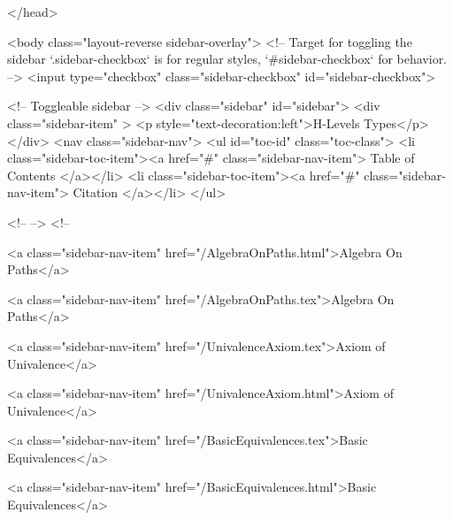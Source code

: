   
</head>




  <body class="layout-reverse sidebar-overlay">
    <!-- Target for toggling the sidebar `.sidebar-checkbox` is for regular
     styles, `#sidebar-checkbox` for behavior. -->
<input type="checkbox" class="sidebar-checkbox" id="sidebar-checkbox">

<!-- Toggleable sidebar -->
<div class="sidebar" id="sidebar">
  <div class="sidebar-item" >
    <p style="text-decoration:left">H-Levels Types</p>
  </div>
  <nav class="sidebar-nav">
    <ul id="toc-id" class="toc-class">
  <li class="sidebar-toc-item"><a href="#" class="sidebar-nav-item"> Table of Contents </a></li>
  <li class="sidebar-toc-item"><a href="#" class="sidebar-nav-item"> Citation </a></li>
</ul>


    <!--  -->
    <!-- 
      
    
      
    
      
    
      
    
      
        
      
    
      
        
          <a class="sidebar-nav-item" href="/AlgebraOnPaths.html">Algebra On Paths</a>
        
      
    
      
        
          <a class="sidebar-nav-item" href="/AlgebraOnPaths.tex">Algebra On Paths</a>
        
      
    
      
        
          <a class="sidebar-nav-item" href="/UnivalenceAxiom.tex">Axiom of Univalence</a>
        
      
    
      
        
          <a class="sidebar-nav-item" href="/UnivalenceAxiom.html">Axiom of Univalence</a>
        
      
    
      
        
          <a class="sidebar-nav-item" href="/BasicEquivalences.tex">Basic Equivalences</a>
        
      
    
      
        
          <a class="sidebar-nav-item" href="/BasicEquivalences.html">Basic Equivalences</a>
        
